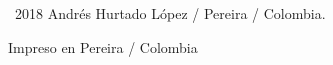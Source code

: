 \vspace*{14cm}
\textcopyright~2018 Andrés Hurtado López / Pereira / Colombia.

\vspace*{1cm}
Impreso en Pereira / Colombia